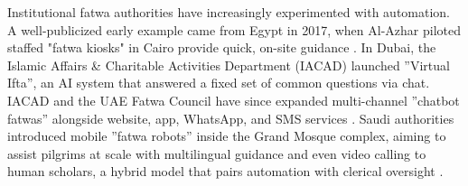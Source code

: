 \documentclass{article}
\begin{document}
Institutional fatwa authorities have increasingly experimented with automation. A well-publicized early example came from Egypt in 2017, when Al-Azhar piloted staffed "fatwa kiosks" in Cairo provide quick, on-site guidance \cite{Reuters2017AlAzharKiosk,Guardian2017Kiosk}. In Dubai, the Islamic Affairs \& Charitable Activities Department (IACAD) launched ''Virtual Ifta'', an AI system that answered a fixed set of common questions via chat. IACAD and the UAE Fatwa Council have since expanded multi-channel ''chatbot fatwas'' alongside website, app, WhatsApp, and SMS services \cite{GulfNews2019VirtualIfta,UAEFatwaCouncilServices}. Saudi authorities introduced mobile ''fatwa robots'' inside the Grand Mosque complex, aiming to assist pilgrims at scale with multilingual guidance and even video calling to human scholars, a hybrid model that pairs automation with clerical oversight \cite{SPA2025Manara,ArabNews2024GuidanceRobot,InterestingEng2025Manara}. 
\end{document}
